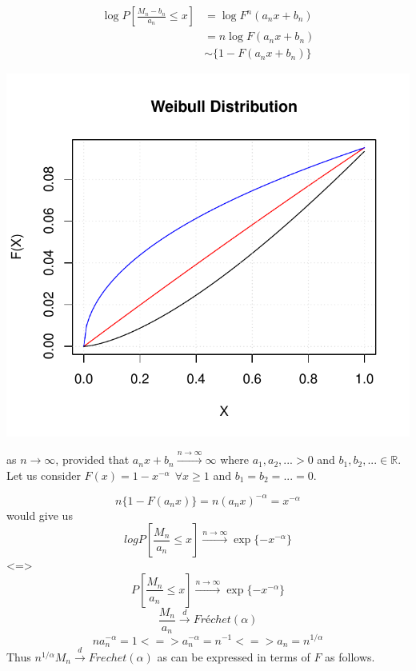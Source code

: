 \documentclass[11pt,a4paper,oneside]{article}\usepackage[]{graphicx}\usepackage[]{color}
\makeatletter
\def\maxwidth{ %
  \ifdim\Gin@nat@width>\linewidth
    \linewidth
  \else
    \Gin@nat@width
  \fi
}
\newenvironment{knitrout}{}{} %
\makeatother
\begin{document}
\begin{align*}
\log P\left[\frac{M_n-b_n}{a_n}\leq x\right] &= \log F^n(a_nx+b_n)\\
&=n\log F(a_nx+b_n)\\
&\sim\{1-F(a_nx+b_n)\}
\end{align*}
\begin{knitrout}
\color{fgcolor}

{\centering \includegraphics[width=\maxwidth]{figure/unnamed-chunk-2-1} 

}



\end{knitrout}

as $n\rightarrow \infty$, provided that $a_nx+b_n\xrightarrow{n\rightarrow\infty}\infty$ where
$a_1,a_2,...>0$ and $b_1,b_2,...\in\mathbb{R}$. Let us consider $F(x)=1-x^{-\alpha}\ \ \forall x \geq 1$ and $b_1=b_2=...=0$.

$$n\{1-F(a_nx)\}=n(a_nx)^{-\alpha}=x^{-\alpha}$$
would give us 
$$log P[\frac{M_n}{a_n}\leq x]\xrightarrow{n\rightarrow\infty}\exp\{-x^{-\alpha}\}$$
<=>
$$P[\frac{M_n}{a_n}\leq x]\xrightarrow{n\rightarrow\infty}\exp\{-x^{-\alpha}\}$$
$$\frac{M_n}{a_n}\xrightarrow{d} Fréchet(\alpha)$$
$$na_n^{-\alpha}=1<=>a_n^{-\alpha}=n^{-1}<=>a_n=n^{1/\alpha}$$
Thus $n^{1/\alpha}M_n\xrightarrow{d}Frechet(\alpha)$ as  can be expressed in terms of $F$ as follows.
\end{document}
